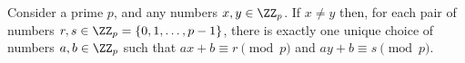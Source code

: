 \begin{lemma}
    Consider a prime $p$, and any numbers $x, y \in \ZZ_p$.  If
    $x \neq y$ then, for each pair of numbers
    $r,s \in \ZZ_{p} = \{0,1, \ldots, p-1\}$,
    there is exactly one unique choice of numbers $a,b \in \ZZ_p$ such
    that $ax + b \equiv r \pmod p$ and $ay + b \equiv s \pmod p$.
\end{lemma}
